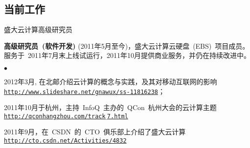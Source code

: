 \documentclass[margin,line]{res}
\newenvironment{list1}{
  \begin{list}{\ding{113}}{%
      \setlength{\itemsep}{0in}
      \setlength{\parsep}{0in} \setlength{\parskip}{0in}
      \setlength{\topsep}{0in} \setlength{\partopsep}{0in} 
      \setlength{\leftmargin}{0.17in}}}{\end{list}}
\newenvironment{list2}{
  \begin{list}{$\bullet$}{%
      \setlength{\itemsep}{0in}
      \setlength{\parsep}{0in} \setlength{\parskip}{0in}
      \setlength{\topsep}{0in} \setlength{\partopsep}{0in} 
      \setlength{\leftmargin}{0.2in}}}{\end{list}}
\newcommand{\http}{http:/\hspace{-0.3ex}/}
\newcommand{\hindent}{\mbox{\hspace{8ex}}}
\begin{document}
\begin{resume}
\section{当前工作}
\textsf{盛大云计算高级研究员}\\
\vspace*{-.1in}
\begin{list1}
\item[] \textbf{高级研究员~(软件开发)}\/ (2011年5月至今)，盛大云计算云硬盘~(EBS)~项目成员。服务于~2011年7月末上线试运行，2011年10月提供商业服务，并仍在持续改进中。
\begin{list2}
\vspace*{.05in}
\item 2012年3月, 在北邮介绍云计算的概念与实践，及其对移动互联网的影响 \\ \hindent\href{http://www.slideshare.net/gnawux/ss-11816238}{\tt\http{}www.slideshare.net/gnawux/ss-11816238}；
\item 2011年10月于杭州，主持~InfoQ~主办的~QCon~杭州大会的云计算主题~\\ \hindent\href{http://qconhangzhou.com/track_7.html}{\tt\http{}qconhangzhou.com/track$\underline{}$7.html}
\item 2011年9月，在~CSDN~的~CTO~俱乐部上介绍了盛大云计算~\\ \hindent\href{http://cto.csdn.net/Activities/4832}{\tt\http{}cto.csdn.net/Activities/4832}
\end{list2}
\end{list1}



\end{resume}
\end{document}
